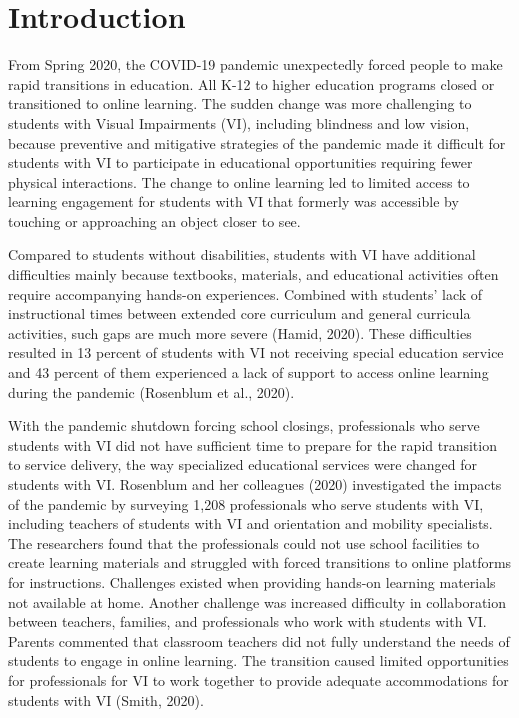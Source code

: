 \documentclass[11pt]{sig-alternate}
\begin{document}
\section*{Introduction}
\begin{large}

From Spring 2020, the COVID-19 pandemic unexpectedly forced people to make rapid transitions in education. All K-12 to higher education programs closed or transitioned to online learning. The sudden change was more challenging to students with Visual Impairments (VI), including blindness and low vision, because preventive and mitigative strategies of the pandemic made it difficult for students with VI to participate in educational opportunities requiring fewer physical interactions. The change to online learning led to limited access to learning engagement for students with VI that formerly was accessible by touching or approaching an object closer to see. 

Compared to students without disabilities, students with VI have additional difficulties mainly because textbooks, materials, and educational activities often require accompanying hands-on experiences. Combined with students' lack of instructional times between extended core curriculum and general curricula activities, such gaps are much more severe (Hamid, 2020). These difficulties resulted in 13 percent of students with VI not receiving special education service and 43 percent of them experienced a lack of support to access online learning during the pandemic (Rosenblum et al., 2020).

With the pandemic shutdown forcing school closings, professionals who serve students with VI did not have sufficient time to prepare for the rapid transition to service delivery, the way specialized educational services were changed for students with VI. Rosenblum and her colleagues (2020) investigated the impacts of the pandemic by surveying 1,208 professionals who serve students with VI, including teachers of students with VI and orientation and mobility specialists. The researchers found that the professionals could not use school facilities to create learning materials and struggled with forced transitions to online platforms for instructions. Challenges existed when providing hands-on learning materials not available at home. Another challenge was increased difficulty in collaboration between teachers, families, and professionals who work with students with VI. Parents commented that classroom teachers did not fully understand the needs of students to engage in online learning. The transition caused limited opportunities for professionals for VI to work together to provide adequate accommodations for students with VI (Smith, 2020).


\end{large}
\end{document}
